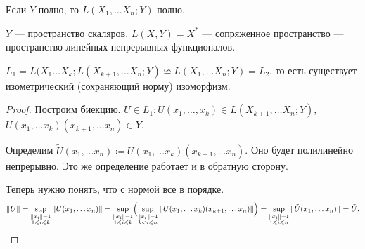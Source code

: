 \begin{thm}
    Если $ Y$ полно, то  $ L(X_1, \ldots X_n; Y) $ полно.
\end{thm}
\begin{ex}
    $ Y$ --- пространство скаляров. $ L(X, Y) = X^{*}$ --- сопряженное пространство --- пространство линейных непрерывных функционалов.
\end{ex}
\begin{thm}
    $ L_1=L(X_1 \ldots X_k; L(X_{k+1}, \ldots X_{n}; Y) \backsimeq L(X_{1}, \ldots X_n; Y) = L_2$, то есть существует изометрический (сохраняющий норму) изоморфизм.
\end{thm}
\begin{proof}
    Построим биекцию.
    $ U \in  L_1 \colon U(x_1, \ldots, x_k) \in  L(X_{k+1}, \ldots X_n;Y) $,\\
    $ U(x_1, \ldots x_k)(x_{k+1}, \ldots x_n) \in Y$.

    Определим $ \tilde U(x_1, \ldots x_n) \coloneqq  U(x_1, \ldots x_k)(x_{k+1}, \ldots x_n)$. Оно будет полилинейно непрерывно. 
Это же определение работает и в обратную сторону.

Теперь нужно понять, что с нормой все в порядке. 
\[
    \| U \| = \sup_{\substack{\| x_i \| = 1\\ 1 \le i \le  k}} \| U(x_1, \ldots x_n) \| =
    \sup_{\substack{\| x_i \|  = 1\\ 1 \le i \le k}} \Bigl(\sup _{\substack{\| x_{i} \| =1\\ k<i \le n }}  \| U(x_1, \ldots x_k)(x_{k+1}, \ldots x_n) \|\Bigr)  =
	\sup_{\substack{\| x_i \|= 1\\1 \le i \le n }} \| \tilde U(x_1, \ldots x_n) \|  = \tilde U
.\] 
\end{proof}
